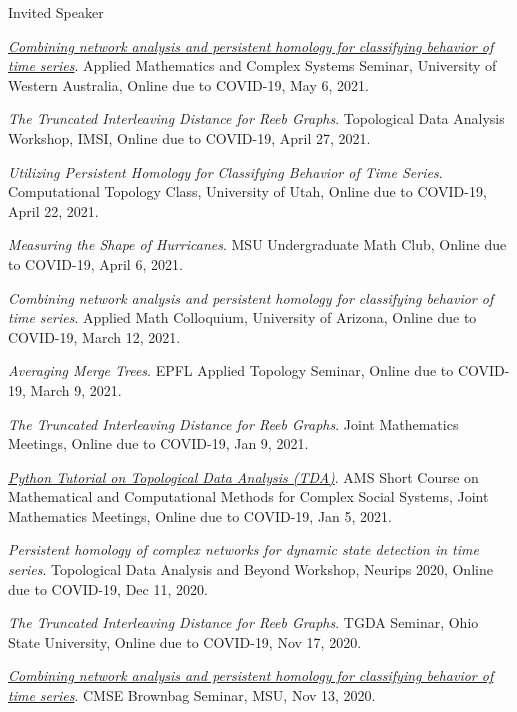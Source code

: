 \documentclass{resume} %
\begin{document}
\begin{rSection}{Invited Speaker}
\begin{etaremune}
\item\emph{\href{https://www.youtube.com/watch?v=EUVk-FXbIog}{Combining network analysis and persistent homology for classifying behavior of time series}}. Applied Mathematics and Complex Systems Seminar, University of Western Australia, Online due to COVID-19, May 6, 2021. 

\item\emph{The Truncated Interleaving Distance for Reeb Graphs}. Topological Data Analysis Workshop, IMSI, Online due to COVID-19, April 27, 2021. 

\item\emph{Utilizing Persistent Homology for Classifying Behavior of Time Series}. Computational Topology Class, University of Utah, Online due to COVID-19, April 22, 2021. 

\item\emph{Measuring the Shape of Hurricanes}. MSU Undergraduate Math Club, Online due to COVID-19, April 6, 2021. 

\item\emph{Combining network analysis and persistent homology for classifying behavior of time series}. Applied Math Colloquium, University of Arizona, Online due to COVID-19, March 12, 2021. 

\item\emph{Averaging Merge Trees}. EPFL Applied Topology Seminar, Online due to COVID-19, March 9, 2021. 

\item\emph{The Truncated Interleaving Distance for Reeb Graphs}. Joint Mathematics Meetings, Online due to COVID-19, Jan 9, 2021. 

\item\emph{\href{https://github.com/lizliz/TDA-Python-Workshop-JMM21}{Python Tutorial on Topological Data Analysis (TDA)}}. AMS Short Course on Mathematical and Computational Methods for Complex Social Systems, Joint Mathematics Meetings, Online due to COVID-19, Jan 5, 2021. 

\item\emph{Persistent homology of complex networks for dynamic state detection in time series}. Topological Data Analysis and Beyond Workshop, Neurips 2020, Online due to COVID-19, Dec 11, 2020. 

\item\emph{The Truncated Interleaving Distance for Reeb Graphs}. TGDA Seminar, Ohio State University, Online due to COVID-19, Nov 17, 2020. 

\item\emph{\href{https://mediaspace.msu.edu/media/t/1_yghdjfiz}{Combining network analysis and persistent homology for classifying behavior of time series}}. CMSE Brownbag Seminar, MSU, Nov 13, 2020. 


\end{etaremune}
\end{rSection}
\end{document}
